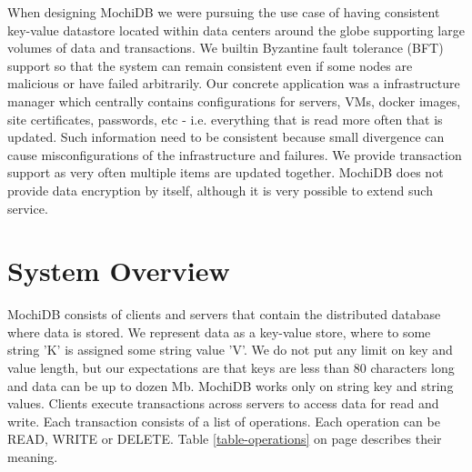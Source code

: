 \documentclass[letterpaper,twocolumn,10pt]{article}
\begin{document}
When designing MochiDB we were pursuing the use case of having consistent key-value datastore located within data centers around the globe supporting large volumes of data and transactions. We builtin Byzantine fault tolerance (BFT) support so that the system can remain consistent even if some nodes are malicious or have failed arbitrarily. Our concrete application was a infrastructure manager which centrally contains configurations for servers, VMs, docker images, site certificates, passwords, etc - i.e. everything that is read more often that is updated. Such information need to be consistent because small divergence can cause misconfigurations of the infrastructure and failures. We provide transaction support as very often multiple items are updated together. MochiDB does not provide data encryption by itself, although it is very possible to extend such service.

\section{System Overview}
MochiDB consists of clients and servers that contain the distributed database where data is stored. We represent data as a key-value store, where to some string 'K' is assigned some string value 'V'. We do not put any limit on key and value length, but our expectations are that keys are less than 80 characters long and data can be up to dozen Mb. MochiDB works only on string key and string values. Clients execute transactions across servers to access data for read and write. Each transaction consists of a list of operations. Each operation can be READ, WRITE or DELETE. Table \ref{table-operations} on page \pageref{table-operations} describes their meaning.

\begin{table}[]
\centering
\caption{MochiDB client operations}
\label{table-operations}
\end{table}
\end{document}

